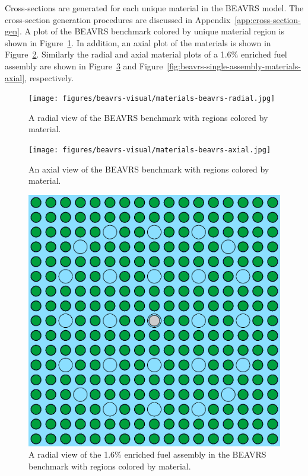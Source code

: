 Cross-sections are generated for each unique material in the BEAVRS model. The cross-section generation procedures are discussed in Appendix~\ref{app:cross-section-gen}. A plot of the BEAVRS benchmark colored by unique material region is shown in Figure~\ref{fig:beavrs-materials-radial}. In addition, an axial plot of the materials is shown in Figure~\ref{fig:beavrs-materials-axial}. Similarly the radial and axial material plots of a 1.6\% enriched fuel assembly are shown in Figure~\ref{fig:beavrs-single-assembly-materials-radial} and Figure~\ref{fig:beavrs-single-assembly-materials-axial}, respectively.


\begin{figure}[h!]
	\centering
	\texttt{[image: figures/beavrs-visual/materials-beavrs-radial.jpg]}
	\caption{A radial view of the BEAVRS benchmark with regions colored by material.}
	\label{fig:beavrs-materials-radial}
\end{figure} 

\begin{figure}[h!]
	\centering
	\texttt{[image: figures/beavrs-visual/materials-beavrs-axial.jpg]}
	\caption{An axial view of the BEAVRS benchmark with regions colored by material.}
	\label{fig:beavrs-materials-axial}
\end{figure} 

\begin{figure}[h!]
	\centering
	\includegraphics[width=0.65\linewidth]{figures/beavrs-visual/materials-single-assembly-radial.png}
	\caption{A radial view of the 1.6\% enriched fuel assembly in the BEAVRS benchmark with regions colored by material.}
	\label{fig:beavrs-single-assembly-materials-radial}
\end{figure} 

